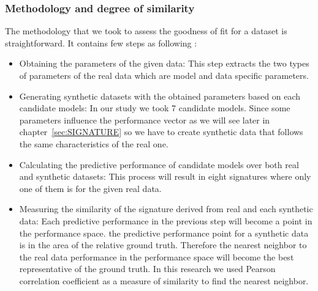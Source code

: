 \subsubsection{Methodology and degree of similarity}
The methodology that we took to assess the goodness of fit for a dataset is straightforward. It contains few steps as following :
\begin{itemize}
\item Obtaining the parameters of the given data: This step extracts the two types of parameters of the real data which are model and data specific parameters. 
\item Generating synthetic datasets with the obtained parameters based on each candidate models: In our study we took 7 candidate models. Since some parameters influence the performance vector as we will see later in chapter~\ref{sec:SIGNATURE} so we have to create synthetic data that follows the same characteristics of the real one.

\item Calculating the predictive performance of candidate models over both real and synthetic datasets: This process will result in eight signatures where only one of them is for the given real data.
\item Measuring the similarity of the signature derived from real and each synthetic data: Each predictive performance in the previous step will become a point in the performance space. the predictive performance point for a synthetic data is in the area of the relative ground truth. Therefore the nearest neighbor to the real data performance in the performance space will become the best representative of the ground truth. In this research we used Pearson correlation coefficient as a measure of similarity to find the nearest neighbor.
\end{itemize}



